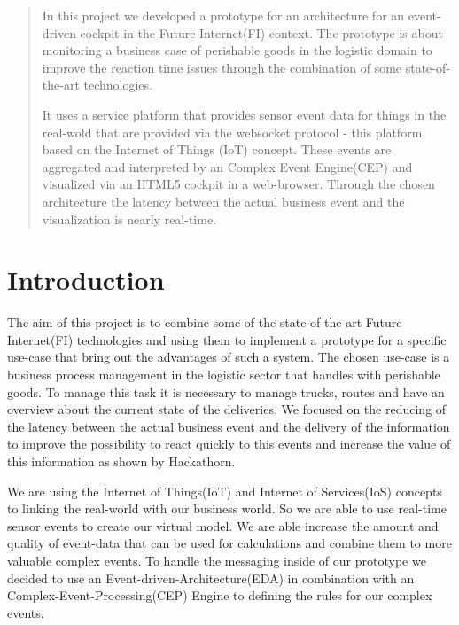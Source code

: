 \documentclass{acm_proc_article-sp}
\begin{document}
\maketitle
\begin{abstract}

In this project we developed a prototype for an architecture for an event-driven cockpit in the Future Internet(FI) context.
The prototype is about monitoring a business case of perishable goods in the logistic domain to improve the reaction time issues through the combination of some state-of-the-art technologies.

It uses a service platform that provides sensor event data for things in the real-wold that are provided via the websocket protocol - this platform based on the Internet of Things (IoT) concept. 
These events are aggregated and interpreted by an Complex Event Engine(CEP) and visualized via an HTML5 cockpit in a web-browser.
Through the chosen architecture the latency between the actual business event and the visualization is nearly real-time.
\end{abstract}

\section{Introduction}
The aim of this project is to combine some of the state-of-the-art Future Internet(FI) technologies and using them to implement a prototype for a specific use-case that bring out the advantages of such a system.
The chosen use-case is a business process management in the logistic sector that handles with perishable goods. To manage this task it is necessary to manage trucks, routes and have an overview about the current state of the deliveries. We focused on the reducing of the latency between the actual business event and the delivery of the information to improve the possibility to react quickly to this events and increase the value of this information as shown by Hackathorn\cite{hackathron:real_time_to_real_value}.

We are using the Internet of Things(IoT) and Internet of Services(IoS) concepts to linking the real-world with our business world. So we are able to use real-time sensor events to create our virtual model. We are able increase the amount and quality of event-data that can be used for calculations and combine them to more valuable complex events.
To handle the messaging inside of our prototype we decided to use an Event-driven-Architecture(EDA) in combination with an Complex-Event-Processing(CEP) Engine to defining the rules for our complex events.
\end{document}
